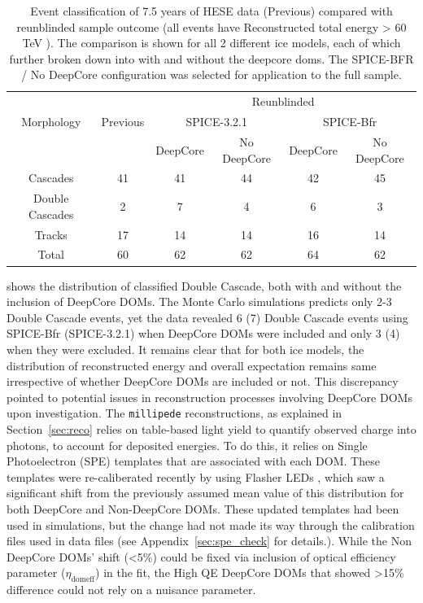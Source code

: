 \begin{table}[h]
    \caption[Event classification of 7.5 years of HESE data, compared with reanalysis done using different ice models and inclusion/exclusion of DeepCore DOMs in the analysis]{Event classification of 7.5 years of HESE data (Previous) compared with reunblinded sample outcome (all events have Reconstructed total energy > 60 TeV ). The comparison is shown for all 2 different ice models, each of which further broken down into with and without the deepcore doms. The SPICE-BFR / No DeepCore configuration was selected for application to the full sample.}
    \raggedright
    \begin{tabular}{ c|c|c c |cc}
        \toprule
            & & \multicolumn{4}{c}{Reunblinded}\\
            
           Morphology&Previous & \multicolumn{2}{c|}{SPICE-3.2.1} & \multicolumn{2}{c}{SPICE-Bfr}\\
           
                     &   & DeepCore & No DeepCore & DeepCore & No DeepCore\\
                                
        \hline
        Cascades & 41 & 41 & 44 &42&45 \\
        Double Cascades & 2 & 7 &4&6& 3 \\
        Tracks& 17&14&14&16&14\\
        \hline
        Total & 60 & 62 &62&64&62\\
        \bottomrule
\end{tabular}
\end{table}
 shows the distribution of classified Double Cascade, both with and without the inclusion of DeepCore DOMs. The Monte Carlo simulations predicts only 2-3 Double Cascade events, yet the data revealed 6 (7) Double Cascade events using SPICE-Bfr (SPICE-3.2.1) when DeepCore DOMs were included and only 3 (4) when they were excluded. It remains clear that for both ice models, the distribution of reconstructed energy and overall expectation remains same irrespective of whether DeepCore DOMs are included or not. This discrepancy pointed to potential issues in reconstruction processes involving DeepCore DOMs upon investigation. The \texttt{millipede} reconstructions, as explained in Section~\ref{sec:reco} relies on table-based light yield to quantify observed charge into photons, to account for deposited energies. To do this, it relies on Single Photoelectron (SPE) templates that are associated with each DOM. These templates were re-caliberated recently by using Flasher LEDs , which saw a significant shift from the previously assumed mean value of this distribution for both DeepCore and Non-DeepCore DOMs. These updated templates had been used in simulations, but the change had not made its way through the calibration files used in data files (see Appendix~\ref{sec:spe_check} for details.). While the Non DeepCore DOMs' shift (<5\%) could be fixed via inclusion of optical efficiency parameter ($\eta_{\mathrm{domeff}}$) in the fit, the High QE DeepCore DOMs that showed >15\% difference could not rely on a nuisance parameter.  


